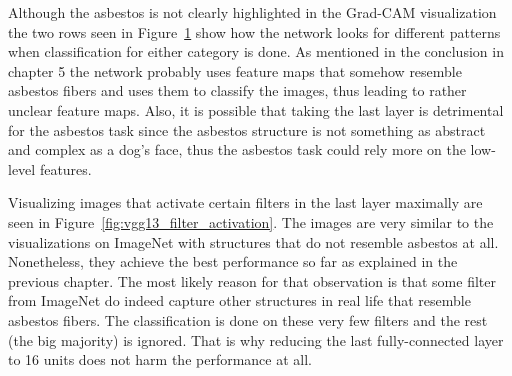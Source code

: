 \begin{figure}[!h]
\label{fig:asbestos_gradcam}
\end{figure}

Although the asbestos is not clearly highlighted in the Grad-CAM visualization the two rows seen in Figure~\ref{fig:asbestos_gradcam} show how the network looks for different patterns when classification for either category is done. As mentioned in the conclusion in chapter 5 the network probably uses feature maps that somehow resemble asbestos fibers and uses them to classify the images, thus leading to rather unclear feature maps. Also, it is possible that taking the last layer is detrimental for the asbestos task since the asbestos structure is not something as abstract and complex as a dog's face, thus the asbestos task could rely more on the low-level features. 

Visualizing images that activate certain filters in the last layer maximally are seen in Figure~\ref{fig:vgg13_filter_activation}. The images are very similar to the visualizations on ImageNet with structures that do not resemble asbestos at all. Nonetheless, they achieve the best performance so far as explained in the previous chapter. The most likely reason for that observation is that some filter from ImageNet do indeed capture other structures in real life that resemble asbestos fibers. The classification is done on these very few filters and the rest (the big majority) is ignored. That is why reducing the last fully-connected layer to 16 units does not harm the performance at all.

